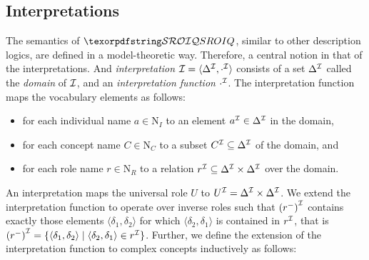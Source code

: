 \subsection{Interpretations} \label{interpretations}

The semantics of $\SROIQ$, similar to other description logics, are defined in a model-theoretic way. Therefore, a central notion in that of the interpretations. And \emph{interpretation} $\mathcal{I} = \langle \Delta^\mathcal{I}, \cdot^\mathcal{I} \rangle$ consists of a set $\Delta^\mathcal{I}$ called the \emph{domain} of $\mathcal{I}$, and an \emph{interpretation function} $\cdot^\mathcal{I}$. The interpretation function maps the vocabulary elements as follows:
\begin{itemize}
  \item for each individual name $a \in \mathrm{N}_I$ to an element $a^\mathcal{I} \in \Delta^\mathcal{I}$ in the domain,
  \item for each concept name $C \in \mathrm{N}_C$ to a subset $C^\mathcal{I} \subseteq \Delta^\mathcal{I}$ of the domain, and
  \item for each role name $r \in \mathrm{N}_R$ to a relation $r^\mathcal{I} \subseteq \Delta^\mathcal{I} \times \Delta^\mathcal{I}$ over the domain.
\end{itemize}
An interpretation maps the universal role $U$ to $U^\mathcal{I} = \Delta^\mathcal{I} \times \Delta^\mathcal{I}$. We extend the interpretation function to operate over inverse roles such that  $\left(r^-\right)^\mathcal{I}$ contains exactly those elements $\langle \delta_1, \delta_2 \rangle$ for which $\langle \delta_2, \delta_1 \rangle$ is contained in $r^\mathcal{I}$, that is  $\left(r^-\right)^\mathcal{I} = \{ \langle \delta_1, \delta_2 \rangle \mid \langle \delta_2, \delta_1 \rangle \in r^\mathcal{I} \}$. Further, we define the extension of the interpretation function to complex concepts inductively as follows:
